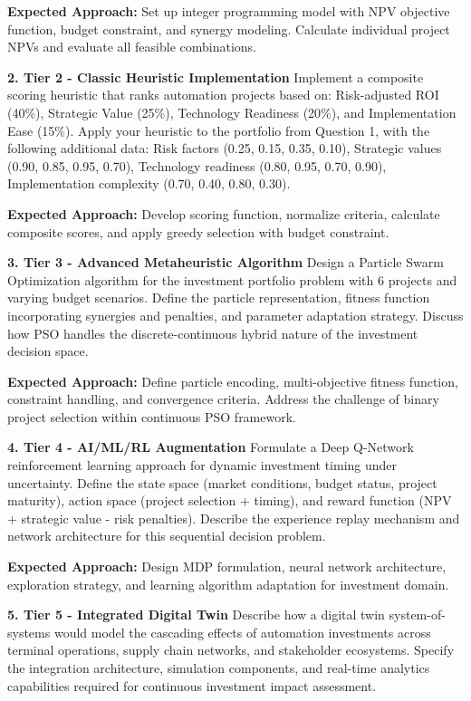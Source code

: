 \documentclass{article}
\begin{document}
\textbf{Expected Approach:} Set up integer programming model with NPV objective function, budget constraint, and synergy modeling. Calculate individual project NPVs and evaluate all feasible combinations.

\textbf{2. Tier 2 - Classic Heuristic Implementation}
Implement a composite scoring heuristic that ranks automation projects based on: Risk-adjusted ROI (40\%), Strategic Value (25\%), Technology Readiness (20\%), and Implementation Ease (15\%). Apply your heuristic to the portfolio from Question 1, with the following additional data: Risk factors (0.25, 0.15, 0.35, 0.10), Strategic values (0.90, 0.85, 0.95, 0.70), Technology readiness (0.80, 0.95, 0.70, 0.90), Implementation complexity (0.70, 0.40, 0.80, 0.30).

\textbf{Expected Approach:} Develop scoring function, normalize criteria, calculate composite scores, and apply greedy selection with budget constraint.

\textbf{3. Tier 3 - Advanced Metaheuristic Algorithm}
Design a Particle Swarm Optimization algorithm for the investment portfolio problem with 6 projects and varying budget scenarios. Define the particle representation, fitness function incorporating synergies and penalties, and parameter adaptation strategy. Discuss how PSO handles the discrete-continuous hybrid nature of the investment decision space.

\textbf{Expected Approach:} Define particle encoding, multi-objective fitness function, constraint handling, and convergence criteria. Address the challenge of binary project selection within continuous PSO framework.

\textbf{4. Tier 4 - AI/ML/RL Augmentation}
Formulate a Deep Q-Network reinforcement learning approach for dynamic investment timing under uncertainty. Define the state space (market conditions, budget status, project maturity), action space (project selection + timing), and reward function (NPV + strategic value - risk penalties). Describe the experience replay mechanism and network architecture for this sequential decision problem.

\textbf{Expected Approach:} Design MDP formulation, neural network architecture, exploration strategy, and learning algorithm adaptation for investment domain.

\textbf{5. Tier 5 - Integrated Digital Twin}
Describe how a digital twin system-of-systems would model the cascading effects of automation investments across terminal operations, supply chain networks, and stakeholder ecosystems. Specify the integration architecture, simulation components, and real-time analytics capabilities required for continuous investment impact assessment.
\end{document}
